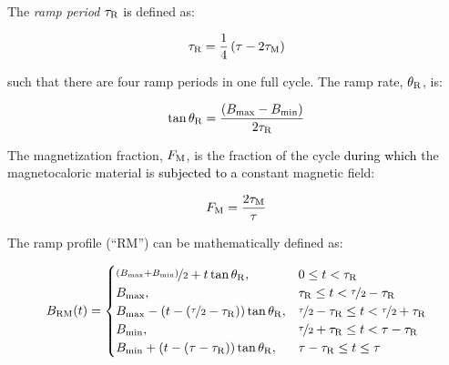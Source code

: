 \documentclass[referee]{svjour3}
\begin{document}
The \emph{ramp period} \(\tau_{\mathrm{R}}\) \textcolor{black}{is} defined as:

\begin{equation}
\label{eq:201}
\tau_{\mathrm{R}} = \frac{1}{4}\left(\tau - 2 \tau_{\mathrm{M}}\right)
\end{equation}

\noindent such that there are four ramp periods in one full cycle. The ramp rate, \(\theta_{\mathrm{R}}\), is:

\begin{equation}
\label{eq:202}
\tan \theta_{\mathrm{R}} = \frac{\left({B}_{\mathrm{max}} - {B}_{\mathrm{min}}\right)}{2\tau_{\mathrm{R}}}
\end{equation}


The magnetization fraction, \(F_{\mathrm{M}}\), is the fraction of the cycle \textcolor{black}{during which} the magnetocaloric material is \textcolor{black}{subjected to a} constant magnetic field:

\begin{equation}
\label{eq:204}
F_{\mathrm{M}} = \frac{2\tau_{\mathrm{M}}}{\tau}
\end{equation}


The ramp profile (``RM'') can be mathematically defined as:

\begin{equation}
{B}_{\mathrm{RM}}(t)=
\begin{cases}
\nicefrac{\left({B}_{\mathrm{max}} + {B}_{\mathrm{min}}\right)}{2} + t \tan \theta_{\mathrm{R}} , & 0 \le t < \tau_{\mathrm{R}} \\
{B}_{\mathrm{max}}, & \tau_{\mathrm{R}} \le t < \nicefrac{\tau}{2} - \tau_{\mathrm{R}}\\
{B}_{\mathrm{max}} - \left(t - \left(\nicefrac{\tau}{2} - \tau_{\mathrm{R}}\right)\right) \tan \theta_{\mathrm{R}} , & \nicefrac{\tau}{2} - \tau_{\mathrm{R}} \le t < \nicefrac{\tau}{2} + \tau_{\mathrm{R}} \\
{B}_{\mathrm{min}}, & \nicefrac{\tau}{2} + \tau_{\mathrm{R}} \le t < \tau - \tau_{\mathrm{R}}\\
{B}_{\mathrm{min}} + \left(t - \left(\tau - \tau_{\mathrm{R}}\right)\right) \tan \theta_{\mathrm{R}} , & \tau - \tau_{\mathrm{R}} \le t \le \tau \\
\end{cases}
\label{eq:203}
\end{equation}
\end{document}
